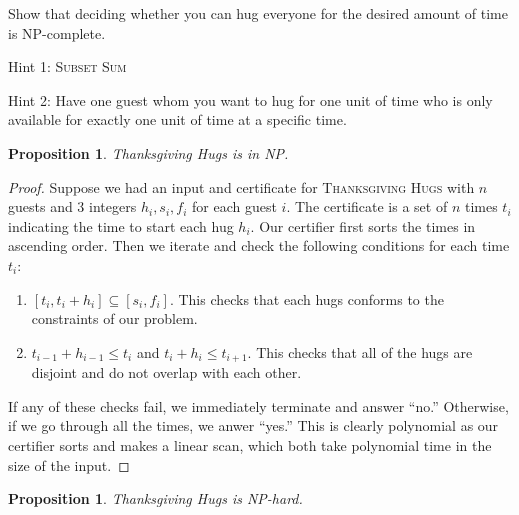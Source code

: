 \documentclass[10pt]{article}
\newtheorem{proposition}[lemma]{Proposition}
\begin{document}
  Show that deciding whether you can hug everyone for the desired amount of time is NP-complete.

  Hint 1: \textsc{Subset Sum}

  Hint 2: Have one guest whom you want to hug for one unit of time who is only available for exactly one unit of time at a specific time.

\begin{proposition}
  Thanksgiving Hugs is in NP.
\end{proposition}

\begin{proof}
  Suppose we had an input and certificate for \textsc{Thanksgiving Hugs} with \(n\) guests and 3 integers \(h_i, s_i, f_i\) for each guest \(i\). The certificate is a set of \(n\) times \(t_i\) indicating the time to start each hug \(h_i\). Our certifier first sorts the times in ascending order. Then we iterate and check the following conditions for each time \(t_i\):
  \begin{enumerate}
    \item \([t_i, t_i + h_i] \subseteq [s_i, f_i]\). This checks that each hugs conforms to the constraints of our problem.
    \item \(t_{i - 1} + h_{i - 1} \leq t_i\) and \(t_i + h_i \leq t_{i + 1}\). This checks that all of the hugs are disjoint and do not overlap with each other.
  \end{enumerate}
  If any of these checks fail, we immediately terminate and answer ``no.'' Otherwise, if we go through all the times, we anwer ``yes.'' This is clearly polynomial as our certifier sorts and makes a linear scan, which both take polynomial time in the size of the input.
\end{proof}

\begin{proposition}
  Thanksgiving Hugs is NP-hard.
\end{proposition}
\end{document}
